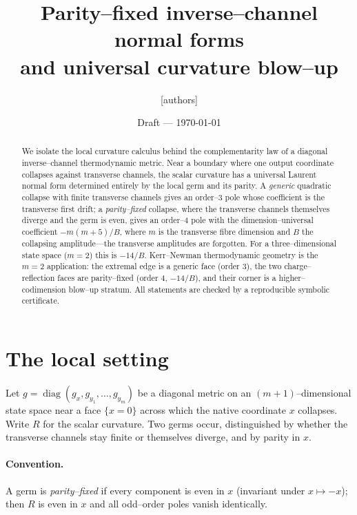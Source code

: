 \documentclass[11pt]{article}
\title{Parity--fixed inverse--channel normal forms\\ and universal curvature blow--up}
\author{[authors]}
\date{Draft --- \today}
\begin{document}
\maketitle

\begin{abstract}
We isolate the local curvature calculus behind the complementarity law of a diagonal
inverse--channel thermodynamic metric. Near a boundary where one output coordinate collapses
against transverse channels, the scalar curvature has a universal Laurent normal form
determined entirely by the local germ and its parity. A \emph{generic} quadratic collapse with
finite transverse channels gives an order--$3$ pole whose coefficient is the transverse first
drift; a \emph{parity--fixed} collapse, where the transverse channels themselves diverge and the
germ is even, gives an order--$4$ pole with the dimension--universal coefficient
$-m(m+5)/B$, where $m$ is the transverse fibre dimension and $B$ the collapsing amplitude---the
transverse amplitudes are forgotten. For a three--dimensional state space ($m=2$) this is
$-14/B$. Kerr--Newman thermodynamic geometry is the $m=2$ application: the extremal edge is a
generic face (order $3$), the two charge--reflection faces are parity--fixed (order $4$,
$-14/B$), and their corner is a higher--codimension blow--up stratum. All statements are
checked by a reproducible symbolic certificate.
\end{abstract}

\section{The local setting}

Let $g=\operatorname{diag}(g_x,g_{y_1},\dots,g_{y_m})$ be a diagonal metric on an
$(m{+}1)$--dimensional state space near a face $\{x=0\}$ across which the native coordinate $x$
collapses. Write $R$ for the scalar curvature. Two germs occur, distinguished by whether the
transverse channels stay finite or themselves diverge, and by parity in $x$.

\paragraph{Convention.} A germ is \emph{parity--fixed} if every component is even in $x$
(invariant under $x\mapsto-x$); then $R$ is even in $x$ and all odd--order poles vanish
identically.

\end{document}
